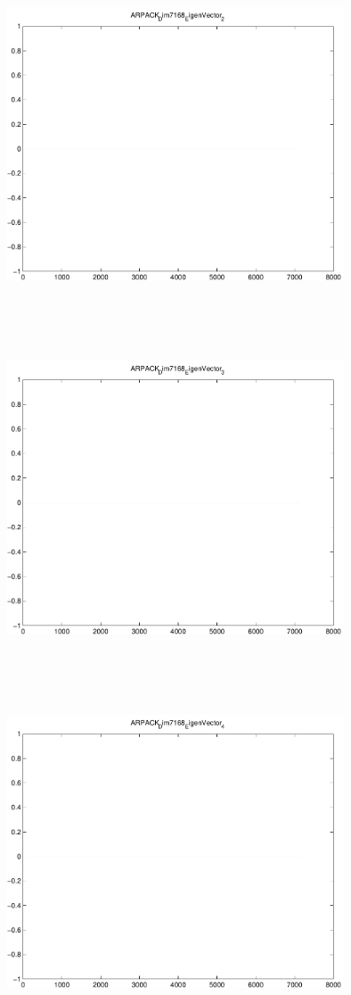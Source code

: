 \documentclass[9pt]{article}
\theoremstyle{plain}
\theoremstyle{definition}
\theoremstyle{remark}
\numberwithin{equation}{section}
\begin{document}
\includegraphics[width=10.0cm,height=10.0cm]{ARPACK_Dim7168_EigenVector_2.pdf}

\includegraphics[width=10.0cm,height=10.0cm]{ARPACK_Dim7168_EigenVector_3.pdf}

\includegraphics[width=10.0cm,height=10.0cm]{ARPACK_Dim7168_EigenVector_4.pdf}
\end{document}
